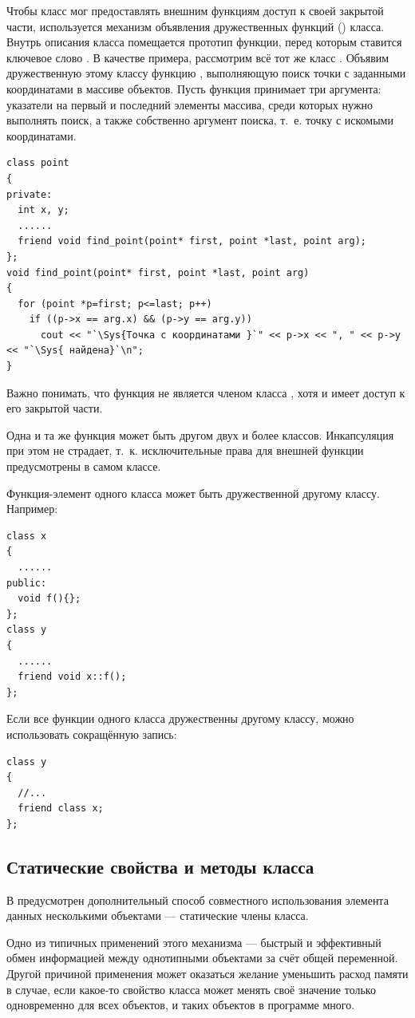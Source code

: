 Чтобы класс мог предоставлять внешним функциям доступ к своей закрытой части, используется механизм объявления
дружественных функций () класса. Внутрь  описания класса помещается прототип функции, перед
которым ставится ключевое слово . В качестве примера, рассмотрим всё тот же класс
. Объявим дружественную этому классу функцию , выполняющую
поиск точки с заданными координатами в массиве объектов. Пусть функция принимает три аргумента: указатели на первый и
последний элементы массива, среди которых нужно выполнять поиск, а также собственно аргумент поиска, т.~е. точку с
искомыми координатами.
\begin{lstlisting}
class point 
{
private:
  int x, y;
  ......
  friend void find_point(point* first, point *last, point arg);
};
void find_point(point* first, point *last, point arg) 
{
  for (point *p=first; p<=last; p++) 
    if ((p->x == arg.x) && (p->y == arg.y)) 
      cout << "`\Sys{Точка с координатами }`" << p->x << ", " << p->y << "`\Sys{ найдена}`\n"; 
}
\end{lstlisting}

Важно понимать, что функция  не является членом класса
, хотя и имеет доступ к его закрытой части.

Одна и та же функция может быть другом двух и более классов. Инкапсуляция при этом не страдает, т.~к. исключительные
права для внешней функции предусмотрены в самом классе.

Функция-элемент одного класса может быть дружественной другому классу. Например:
\begin{lstlisting}
class x 
{
  ......
public:
  void f(){};
};
class y 
{
  ......
  friend void x::f();
};
\end{lstlisting}

Если все функции одного класса дружественны другому классу, можно использовать сокращённую запись:
\begin{lstlisting}
class y 
{
  //...
  friend class x;
};
\end{lstlisting}

\subsection[Статические свойства и методы класса]{Статические свойства и методы класса}
В  предусмотрен дополнительный способ совместного использования элемента данных  несколькими объектами --- статические
члены класса. 

Одно из типичных применений этого механизма --- быстрый и эффективный обмен информацией между однотипными объектами за
счёт общей переменной. Другой причиной применения может оказаться желание уменьшить расход памяти в случае, если
какое-то свойство класса может менять своё значение только одновременно для всех объектов, и таких объектов в программе
много.

